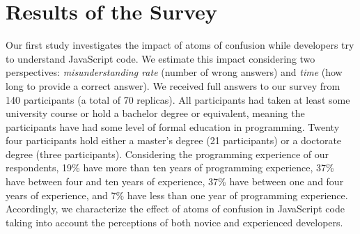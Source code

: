 

\section{Results of the Survey}
\label{sec:survey-resuts} 

Our first study investigates the impact of atoms of confusion while developers try to understand JavaScript code.
We estimate this impact considering two perspectives: \emph{misunderstanding rate} (number of wrong answers)
and \emph{time} (how long to provide a correct answer).
We received full answers to our survey from 140 participants (a total of 70 replicas).
All participants had taken at least some university course or hold a bachelor
degree or equivalent, meaning the participants have had some level of formal education in programming. Twenty four participants hold either a master's degree (21 participants) or a doctorate degree (three participants). 
Considering the programming experience of our respondents, 19\% have more than ten years of programming experience, 37\% have between four and ten years of experience, 37\% have between one and four years of experience, and 7\% have less than one year of programming experience.  
Accordingly, we characterize the effect of atoms of confusion in JavaScript
code taking into account the perceptions of both novice and experienced developers. 





